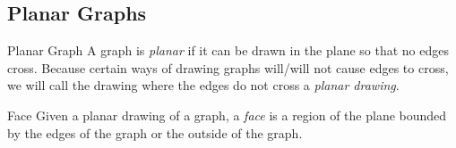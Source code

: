 \documentclass[class=article, crop=false]{standalone}
\begin{document}
  \subsection{Planar Graphs}
  \begin{definition}{Planar Graph}
    A graph is \emph{planar} if it can be drawn in the plane so that no edges cross. Because certain ways of drawing graphs will/will not cause edges to cross, we will call the drawing where the edges do not cross a \emph{planar drawing}.
  \end{definition}
  \begin{definition}{Face}
    Given a planar drawing of a graph, a \emph{face} is a region of the plane bounded by the edges of the graph or the outside of the graph.
  \end{definition}
\end{document}

